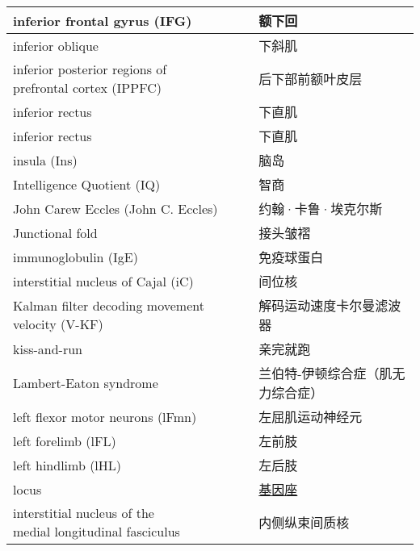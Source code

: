 \begin{longtable}{lll}
	\midrule
	inferior frontal gyrus (IFG)   && 额下回  \\
	
	\midrule
	inferior oblique   && 下斜肌  \\
	
	\midrule
	\makecell{inferior posterior regions of \\ prefrontal cortex (IPPFC)}  && 后下部前额叶皮层  \\
	
	\midrule
	inferior rectus   && 下直肌  \\
	
	\midrule
	inferior rectus   && 下直肌  \\
	
	\midrule
	insula (Ins)   && 脑岛  \\
	
	\midrule
	Intelligence Quotient (IQ)   && 智商  \\
	
	\midrule
	John Carew Eccles (John C. Eccles)   && 约翰·卡鲁·埃克尔斯  \\
	
	\midrule
	Junctional fold   && 接头皱褶  \\
	
	\midrule
	immunoglobulin (IgE)   && 免疫球蛋白  \\
	
	\midrule
	interstitial nucleus of Cajal (iC)   && 间位核  \\
	
	\midrule
	Kalman filter decoding movement velocity (V-KF)   && 解码运动速度卡尔曼滤波器  \\
	
	\midrule
	kiss-and-run   && 亲完就跑  \\
	
	\midrule
	Lambert-Eaton syndrome   && 兰伯特-伊顿综合症（肌无力综合症）  \\
	
	\midrule
	left flexor motor neurons (lFmn)   && 左屈肌运动神经元  \\
	
	\midrule
	left forelimb (lFL)   && 左前肢  \\
	
	\midrule
	left hindlimb (lHL)   && 左后肢  \\
	
	\midrule
	locus   && \href{https://baike.baidu.com/item/Locus/1628923}{基因座}  \\
	
	\midrule
	\makecell{interstitial nucleus of the \\medial longitudinal fasciculus}   && 内侧纵束间质核  \\
	

\end{longtable}
